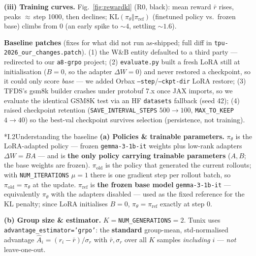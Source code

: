 \documentclass[11pt]{article}
\makeatletter
\newcommand{\code}[1]{\texttt{#1}}
\let\origsec\section
\renewcommand{\section}{\@ifstar{\tx@sec}{\origsec}}
\newcommand{\tx@sec}[1]{\phantomsection\origsec*{#1}\addcontentsline{toc}{subsection}{#1}}
\makeatother
\begin{document}
\textbf{(iii) Training curves.} Fig.~\ref{fig:rewardkl} (R0, black): mean reward $\bar r$ rises, peaks $\approx$\,step 1000, then declines;
$\mathrm{KL}(\pi_\theta\Vert\pi_{\mathrm{ref}})$ (finetuned policy vs.\ frozen base) climbs from $0$ (an early spike to ${\sim}4$, settling ${\sim}1.6$).

\textbf{Baseline patches} (fixes for what did not run as-shipped; full diff in \code{tpu-2026\_our\_changes.patch}).
(1) the W\&B entity defaulted to a third party --- redirected to our \code{a8-grpo} project;
(2) \code{evaluate.py} built a fresh LoRA still at initialisation ($B{=}0$, so the adapter $\Delta W{=}0$) and never restored a checkpoint, so it could only score \emph{base} --- we added Orbax
\code{--step}/\code{--ckpt-dir} LoRA restore;
(3) TFDS's gsm8k builder crashes under protobuf 7.x once JAX imports, so we evaluate the identical GSM8K test via an HF \code{datasets} fallback (seed 42);
(4) raised checkpoint retention (\code{SAVE\_INTERVAL\_STEPS} $500{\to}100$, \code{MAX\_TO\_KEEP} $4{\to}40$) so the best-val checkpoint survives selection (persistence, not training).

\section*{I.2\quad Understanding the baseline}
\textbf{(a) Policies \& trainable parameters.} $\pi_\theta$ is the LoRA-adapted policy --- frozen \code{gemma-3-1b-it} weights plus low-rank
adapters $\Delta W{=}BA$ --- and is \textbf{the only policy carrying trainable parameters} ($A,B$; the base weights are frozen). $\pi_{\mathrm{old}}$
is the policy that generated the current rollouts; with \code{NUM\_ITERATIONS} $\mu{=}1$ there is one gradient step per rollout batch, so
$\pi_{\mathrm{old}}{=}\pi_\theta$ at the update. $\pi_{\mathrm{ref}}$ is \textbf{the frozen base model} \code{gemma-3-1b-it} --- equivalently $\pi_\theta$
with the adapters disabled --- used as the fixed reference for the KL penalty; since LoRA initialises $B{=}0$, $\pi_\theta{=}\pi_{\mathrm{ref}}$ exactly at step 0.

\textbf{(b) Group size \& estimator.} $K{=}$\code{NUM\_GENERATIONS}$=2$. Tunix uses \code{advantage\_estimator='grpo'}: the \textbf{standard}
group-mean, std-normalised advantage $\hat A_i{=}(r_i-\bar r)/\sigma_r$ with $\bar r,\sigma_r$ over all $K$ samples \emph{including} $i$ --- \emph{not}
leave-one-out.
\end{document}
